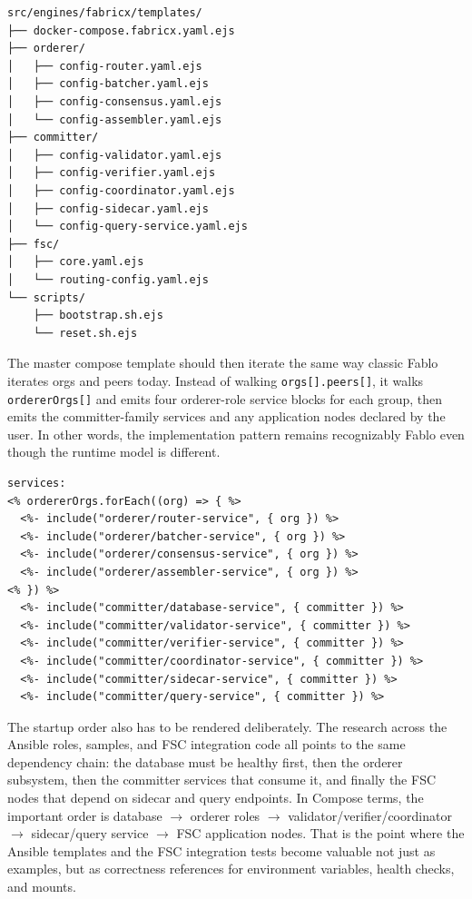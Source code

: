\begin{tcolorbox}[colback=gray!5!white, colframe=gray!50!black,
  title=Planned Fabric-X template tree,
  fonttitle=\bfseries, arc=4pt]
\begin{lstlisting}[language={}, basicstyle=\ttfamily\footnotesize]
src/engines/fabricx/templates/
├── docker-compose.fabricx.yaml.ejs
├── orderer/
│   ├── config-router.yaml.ejs
│   ├── config-batcher.yaml.ejs
│   ├── config-consensus.yaml.ejs
│   └── config-assembler.yaml.ejs
├── committer/
│   ├── config-validator.yaml.ejs
│   ├── config-verifier.yaml.ejs
│   ├── config-coordinator.yaml.ejs
│   ├── config-sidecar.yaml.ejs
│   └── config-query-service.yaml.ejs
├── fsc/
│   ├── core.yaml.ejs
│   └── routing-config.yaml.ejs
└── scripts/
    ├── bootstrap.sh.ejs
    └── reset.sh.ejs
\end{lstlisting}
\end{tcolorbox}

The master compose template should then iterate the same way classic Fablo iterates orgs and peers today. Instead of walking \texttt{orgs[].peers[]}, it walks \texttt{ordererOrgs[]} and emits four orderer-role service blocks for each group, then emits the committer-family services and any application nodes declared by the user. In other words, the implementation pattern remains recognizably Fablo even though the runtime model is different.

\begin{tcolorbox}[colback=gray!5!white, colframe=gray!50!black,
  title=Master Fabric-X compose iteration (illustrative),
  fonttitle=\bfseries, arc=4pt]
\begin{lstlisting}[language=ejs, basicstyle=\ttfamily\footnotesize]
services:
<% ordererOrgs.forEach((org) => { %>
  <%- include("orderer/router-service", { org }) %>
  <%- include("orderer/batcher-service", { org }) %>
  <%- include("orderer/consensus-service", { org }) %>
  <%- include("orderer/assembler-service", { org }) %>
<% }) %>
  <%- include("committer/database-service", { committer }) %>
  <%- include("committer/validator-service", { committer }) %>
  <%- include("committer/verifier-service", { committer }) %>
  <%- include("committer/coordinator-service", { committer }) %>
  <%- include("committer/sidecar-service", { committer }) %>
  <%- include("committer/query-service", { committer }) %>
\end{lstlisting}
\end{tcolorbox}

The startup order also has to be rendered deliberately. The research across the Ansible roles, samples, and FSC integration code all points to the same dependency chain: the database must be healthy first, then the orderer subsystem, then the committer services that consume it, and finally the FSC nodes that depend on sidecar and query endpoints. In Compose terms, the important order is database $\rightarrow$ orderer roles $\rightarrow$ validator/verifier/coordinator $\rightarrow$ sidecar/query service $\rightarrow$ FSC application nodes. That is the point where the Ansible templates and the FSC integration tests become valuable not just as examples, but as correctness references for environment variables, health checks, and mounts.

